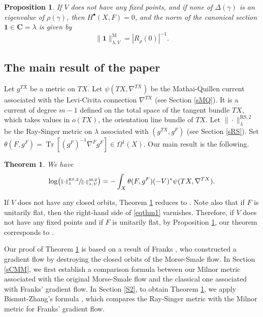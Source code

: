 \documentclass[11pt]{article}
\numberwithin{equation}{section}
\newcommand{\sbullet}{{\scriptscriptstyle\bullet}}
\newcommand{\rM}{\mathrm{M}}
\newcommand{\RS}{\mathrm{RS}}
\theoremstyle{plain}
\newtheorem{thm}[lem]{Theorem}
\newtheorem{prop}[lem]{Proposition}
\theoremstyle{definition}
\theoremstyle{remark}
\newcommand{\bC}{\mathbf{C}}
\DeclareMathOperator{\Tr}{Tr}
\begin{document}
\begin{prop}\label{prop}
If $V$ does not have any fixed points, and if none of $\Delta(\gamma)$ is an eigenvalue of $\rho(\gamma)$, then
$H^{\sbullet}(X,F)=0$, and the norm of the canonical section
$\mathbf{1}\in \bC=\lambda$ is given by
\begin{equation*}
\|\mathbf{1}\|^{\rM}_{\lambda,V}=|R_{\rho}(0)|^{-1}.
\end{equation*}
\end{prop}

\subsection{The main result of the paper}
Let $g^{TX}$ be a metric on $TX$. Let
$\psi(TX,\nabla^{TX})$ be the Mathai-Quillen current associated with the
Levi-Civita connection $\nabla^{TX}$ (see Section \ref{sMQ}). It is a
current of degree $m-1$ defined
on the total space of the tangent bundle $TX$, which takes values in
$o(TX)$, the orientation line bundle of $TX$. Let $\|{\cdot}\|^{\RS,2}_{\lambda}$ be the Ray-Singer metric
on $\lambda$ associated with $(g^{TX},g^{F})$ (see Section \ref{sRS}).
Set $
\theta(F,g^{F})=\Tr[(g^{F})^{-1}\nabla^{F}g^{F}]\in \Omega^{1}(X)$.
Our main result is the following.

\begin{thm}\label{thm1} We have
\begin{equation}\label{eqthm1}
\log
\bigl(\sfrac{\|{\cdot}\|^{\RS,2}_{\lambda}}{\|{\cdot}\|^{\rM,2}_{\lambda,V}}\bigr)=-\int_{X}\theta(F,g^{F})(-V)^{*}\psi(TX,\nabla^{TX}).
\end{equation}
\end{thm}

If $V$ does not have any closed orbits, Theorem \ref{thm1} reduces to
\cite[Th.\,0.2]{BZ92}. Note also that if $F$ is unitarily flat, then the right-hand side of
\eqref{eqthm1} varnishes. Therefore, if $V$ does not have any fixed
points and if $F$ is unitarily flat, by Proposition \ref{prop}, our theorem corresponds to \cite[Th.\,3.1]{Friedconj}.

Our proof of Theorem \ref{thm1} is based on a result of Franks
\cite[Prop.\,5.1]{Franks1979}, who
constructed a gradient flow by destroying the
closed orbits of the Morse-Smale flow.
In Section \ref{sCMM}, we first
establish a comparison formula between our Milnor metric associated with the original Morse-Smale flow
and the classical one associated with Franks'
gradient flow. In Section \ref{S2}, to obtain Theorem \ref{thm1}, we apply Bismut-Zhang's formula \cite[Th.\,0.2]{BZ92}, which compares the Ray-Singer metric with the
Milnor metric for Franks' gradient flow.
\end{document}
